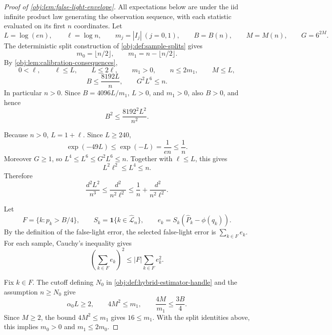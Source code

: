 \documentclass[11pt]{article}
\begin{document}
\begin{proof}[Proof of \cref{obj:lem:false-light-envelope}]
All expectations below are under the iid infinite product law generating the observation sequence, with each statistic evaluated on its first \(n\) coordinates.  Let
\[
L=\log(en),\qquad \ell=\log n,
\qquad m_j=|I_j|\ (j=0,1),
\qquad B=B(n),\qquad M=M(n),
\qquad G=6^{2M}.
\]
The deterministic split construction of \cref{obj:def:sample-splits} gives
\[
m_0=\lfloor n/2\rfloor,
\qquad
m_1=n-\lfloor n/2\rfloor .
\]
By \cref{obj:lem:calibration-consequences},
\[
0<\ell,
\qquad \ell\le L,
\qquad L\le 2\ell,
\qquad m_1>0,
\qquad n\le 2m_1,
\qquad M\le L,
\]
\[
B\le\frac{8192L}{n},
\qquad G^2L^6\le n .
\]
In particular \(n>0\).  Since \(B=4096L/m_1\), \(L>0\), and \(m_1>0\), also \(B>0\), and hence
\[
B^2\le \frac{8192^2L^2}{n^2}.
\]

Because \(n>0\), \(L=1+\ell\).  Since \(L\ge240\),
\[
\exp(-49L)\le \exp(-L)=\frac1{en}\le \frac1n .
\]
Moreover \(G\ge1\), so \(L^4\le L^6\le G^2L^6\le n\).  Together with \(\ell\le L\), this gives
\[
L^2\ell^2\le L^4\le n.
\]
Therefore
\[
\frac{d^2L^2}{n^3}
\le
\frac{d^2}{n^2\ell^2}
\le
\frac1n+\frac{d^2}{n^2\ell^2}.
\]

Let
\[
F=\{k:p_k>B/4\},
\qquad
S_k=\mathbf 1\{k\in\widehat{\mathcal L}_n\},
\qquad
e_k=S_k(\widehat P_k-\phi(q_k)).
\]
By the definition of the false-light error, the selected false-light error is \(\sum_{k\in F}e_k\).  For each sample, Cauchy's inequality gives
\[
\left(\sum_{k\in F}e_k\right)^2
\le
|F|\sum_{k\in F}e_k^2 .
\]

Fix \(k\in F\).  The cutoff defining \(N_0\) in \cref{obj:def:hybrid-estimator-handle} and the assumption \(n\ge N_0\) give
\[
\alpha_0L\ge2,
\qquad
4M^2\le m_1,
\qquad
\frac{4M}{m_1}\le \frac{3B}{4}.
\]
Since \(M\ge2\), the bound \(4M^2\le m_1\) gives \(16\le m_1\).  With the split identities above, this implies \(m_0>0\) and \(m_1\le2m_0\).


\end{proof}
\end{document}
